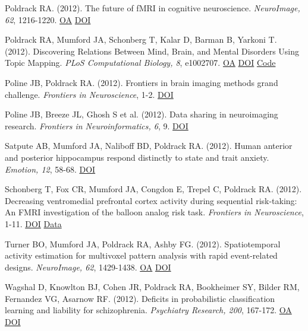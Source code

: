\documentclass[10pt, letterpaper]{article}
\begin{document}
Poldrack RA.  (2012). The future of fMRI in cognitive neuroscience. \textit{NeuroImage, 62}, 1216-1220. \href{https://www.ncbi.nlm.nih.gov/pmc/articles/PMC4131441}{OA} \href{https://doi.org/10.1016/j.neuroimage.2011.08.007}{DOI} \vspace{2mm}

Poldrack RA, Mumford JA, Schonberg T, Kalar D, Barman B, Yarkoni T.  (2012). Discovering Relations Between Mind, Brain, and Mental Disorders Using Topic Mapping. \textit{PLoS Computational Biology, 8}, e1002707. \href{https://www.ncbi.nlm.nih.gov/pmc/articles/PMC3469446}{OA} \href{https://doi.org/10.1371/journal.pcbi.1002707}{DOI} \href{https://github.com/poldrack/LatentStructure}{Code} \vspace{2mm}

Poline JB, Poldrack RA.  (2012). Frontiers in brain imaging methods grand challenge. \textit{Frontiers in Neuroscience}, 1-2. \href{https://doi.org/10.3389/fnins.2012.00096}{DOI} \vspace{2mm}

Poline JB, Breeze JL, Ghosh S et al. (2012). Data sharing in neuroimaging research. \textit{Frontiers in Neuroinformatics, 6}, 9. \href{https://doi.org/10.3389/fninf.2012.00009}{DOI} \vspace{2mm}

Satpute AB, Mumford JA, Naliboff BD, Poldrack RA.  (2012). Human anterior and posterior hippocampus respond distinctly to state and trait anxiety. \textit{Emotion, 12}, 58-68. \href{https://doi.org/10.1037/a0026517}{DOI} \vspace{2mm}

Schonberg T, Fox CR, Mumford JA, Congdon E, Trepel C, Poldrack RA.  (2012). Decreasing ventromedial prefrontal cortex activity during sequential risk-taking: An FMRI investigation of the balloon analog risk task. \textit{Frontiers in Neuroscience}, 1-11. \href{https://doi.org/10.3389/fnins.2012.00080}{DOI} \href{https://openneuro.org/datasets/ds000001/versions/1.0.0}{Data} \vspace{2mm}

Turner BO, Mumford JA, Poldrack RA, Ashby FG.  (2012). Spatiotemporal activity estimation for multivoxel pattern analysis with rapid event-related designs. \textit{NeuroImage, 62}, 1429-1438. \href{https://www.ncbi.nlm.nih.gov/pmc/articles/PMC3408801}{OA} \href{https://doi.org/10.1016/j.neuroimage.2012.05.057}{DOI} \vspace{2mm}

Wagshal D, Knowlton BJ, Cohen JR, Poldrack RA, Bookheimer SY, Bilder RM, Fernandez VG, Asarnow RF.  (2012). Deficits in probabilistic classification learning and liability for schizophrenia. \textit{Psychiatry Research, 200}, 167-172. \href{https://www.ncbi.nlm.nih.gov/pmc/articles/PMC5332149}{OA} \href{https://doi.org/10.1016/j.psychres.2012.06.009}{DOI} \vspace{2mm}
\end{document}
